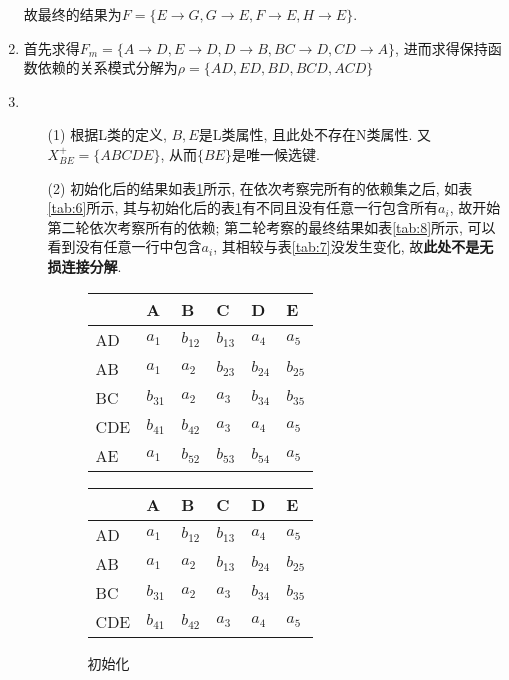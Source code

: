 \documentclass[10pt, a4paper]{article}
\begin{document}
\begin{enumerate}
\begin{enumerate}
		\end{enumerate}
		故最终的结果为$F=\{E\to G, G\to E, F\to E, H\to E\}$.
		\item 首先求得$F_m=\{A\to D, E\to D, D\to B, BC\to D, CD\to A\}$, 进而求得保持函数依赖的关系模式分解为$\rho = \{AD, ED, BD, BCD, ACD\}$
		\item \begin{enumerate}
			\item[(1)] 根据L类的定义, $B, E$是L类属性, 且此处不存在N类属性. 又$X_{BE}^+ = \{ABCDE\}$, 从而$\{BE\}$是唯一候选键.
			\item[(2)] 初始化后的结果如表\ref{tab:1}所示, 在依次考察完所有的依赖集之后, 如表\ref{tab:6}所示, 其与初始化后的表\ref{tab:1}有不同且没有任意一行包含所有$a_i$, 故开始第二轮依次考察所有的依赖;
			第二轮考察的最终结果如表\ref{tab:8}所示, 可以看到没有任意一行中包含$a_i$, 其相较与表\ref{tab:7}没发生变化, 故\textbf{此处不是无损连接分解}.
			\begin{figure}[H]
				\begin{minipage}[b]{0.5\linewidth}
					\centering
					\begin{tabular}{|l|l|l|l|l|l|}
						\hline
							& A & B & C & D & E \\ \hline
						AD  & $a_1$ & $b_{12}$ & $b_{13}$  & $a_4$  & $a_5$  \\ \hline
						AB  & $a_1$ & $a_2$  & $b_{23}$  & $b_{24}$ & $b_{25}$  \\ \hline
						BC  & $b_{31}$ &  $a_2$ & $a_3$ & $b_{34}$ & $b_{35}$ \\ \hline
						CDE & $b_{41}$ & $b_{42}$ & $a_3$ & $a_4$ & $a_5$ \\ \hline
						AE  & $a_1$ & $b_{52}$ & $b_{53}$ & $b_{54}$ & $a_5$ \\ \hline
						\end{tabular}
						\caption{初始化}\label{tab:1}
				\end{minipage}
				\begin{minipage}[b]{0.5\linewidth}
					\centering
					\begin{tabular}{|l|l|l|l|l|l|}
						\hline
							& A & B & C & D & E \\ \hline
						AD  & $a_1$ & $b_{12}$ & $b_{13}$  & $a_4$  & $a_5$  \\ \hline
						AB  & $a_1$ & $a_2$  & $b_{13}$  & $b_{24}$ & $b_{25}$  \\ \hline
						BC  & $b_{31}$ &  $a_2$ & $a_3$ & $b_{34}$ & $b_{35}$ \\ \hline
						CDE & $b_{41}$ & $b_{42}$ & $a_3$ & $a_4$ & $a_5$ \\ \hline

\end{tabular}
\end{minipage}
\end{figure}
\end{enumerate}
\end{enumerate}
\end{document}
